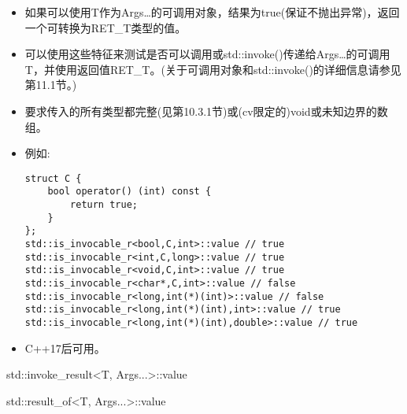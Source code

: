 \begin{itemize}
\item 
如果可以使用T作为Args…的可调用对象，结果为true(保证不抛出异常)，返回一个可转换为RET\_T类型的值。

\item 
可以使用这些特征来测试是否可以调用或std::invoke()传递给Args…的可调用T，并使用返回值RET\_T。(关于可调用对象和std::invoke()的详细信息请参见第11.1节。)

\item 
要求传入的所有类型都完整(见第10.3.1节)或(cv限定的)void或未知边界的数组。

\item 
例如:
\begin{lstlisting}[style=styleCXX]
struct C {
	bool operator() (int) const {
		return true;
	}
};
std::is_invocable_r<bool,C,int>::value // true
std::is_invocable_r<int,C,long>::value // true
std::is_invocable_r<void,C,int>::value // true
std::is_invocable_r<char*,C,int>::value // false
std::is_invocable_r<long,int(*)(int)>::value // false
std::is_invocable_r<long,int(*)(int),int>::value // true
std::is_invocable_r<long,int(*)(int),double>::value // true
\end{lstlisting}

\item 
C++17后可用。
\end{itemize}

std::invoke\_result<T, Args...>::value

std::result\_of<T, Args...>::value

